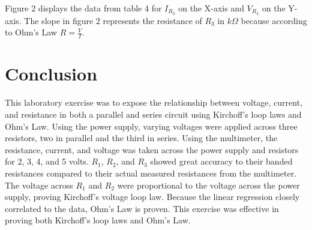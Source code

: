 \documentclass[CMPE]{KGCOEReport}
\begin{document}
Figure 2 displays the data from table 4 for $I_{R_3}$ on the X-axis and $V_{R_3}$ on the Y-axis. The slope in figure 2 represents the resistance of $R_3$ in $k\Omega$ because according to Ohm's Law $R = \frac{V}{I}$.

\section*{Conclusion}

This laboratory exercise was to expose the relationship between voltage, current, and resistance in both a parallel and series circuit using Kirchoff’s loop laws and Ohm’s Law. Using the power supply, varying voltages were applied across three resistors, two in parallel and the third in series. Using the multimeter, the resistance, current, and voltage was taken across the power supply and resistors for 2, 3, 4, and 5 volts. $R_1$, $R_2$, and $R_3$ showed great accuracy to their banded resistances compared to their actual measured resistances from the multimeter. The voltage across $R_1$ and $R_2$ were proportional to the voltage across the power supply, proving Kirchoff’s voltage loop law. Because the linear regression closely correlated to the data, Ohm’s Law is proven. This exercise was effective in proving both Kirchoff’s loop laws and Ohm’s Law.
\end{document}
